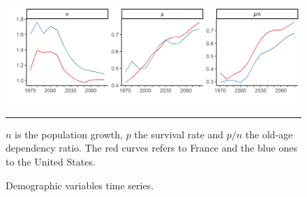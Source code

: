 \begin{figure}[!tb]
	\centering
	\includegraphics[width=1\linewidth]{../result/demo_npdep.png}
	\caption{Demographic variables time series.} 
	\label{fig:demo}
	\vspace{.5ex}
	\hrule
	\vspace{-4ex}
	\justify\singlespacing\footnotesize $n$ is the population growth, $p$ the survival rate and $p/n$ the old-age dependency ratio. The red curves refers to France and the blue ones to the United States.
\end{figure}


